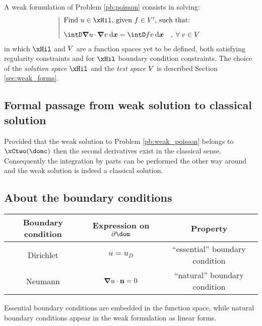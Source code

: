 \medskip
A weak formulation of Problem \eqref{pb:poisson} consists in solving:
\begin{equation}\label{pb:weak_poisson}
\left\lvert
\begin{array}{ll}
\mbox{Find $u \in \xHil$, given $f \in \xV'$, such that:}\\[2ex]
\displaystyle\intD \Grad u\xDot \Grad v\dxx = \intD f v  \dxx\quad,\;\forany  v\in \xV
\end{array}
\right .
\end{equation}
in which $\xHil$ and ${V}$ are a function spaces yet to be defined, both satisfying regularity constraints and for $\xHil$ boundary condition constraints.
The choice of the \textit{solution space} $\xHil$ and the \textit{test space} ${V}$ is described Section \ref{sec:weak_forms}.

\subsection{Formal passage from weak solution to classical solution}

Provided that the weak solution to Problem \eqref{pb:weak_poisson} belongs to $\xCtwo(\domc)$ then the second derivatives exist in the classical sense.
Consequently the integration by parts can be performed the other way around and the weak solution is indeed a classical solution.

\subsection{About the boundary conditions}\label{sssec:bcs}

\begin{center}
\begin{tabular}[width=0.5\textwidth]{|c|c|c|}
\hline
Boundary condition & Expression on $\partial\dom$ & Property \\
\hline
\hline
Dirichlet     & $u = u_D$             & ``essential'' boundary condition \\
Neumann       & ${\boldsymbol\nabla} u\cdot\mathbf n = 0$ &  ``natural'' boundary condition  \\
\hline
\end{tabular}
\end{center}

Essential boundary conditions are embedded in the function space, while natural boundary conditions appear in the weak formulation as linear forms.

